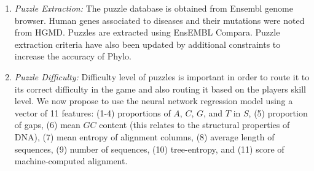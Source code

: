 \documentclass{article}
\begin{document}
\begin{enumerate}
  \item \textit{Puzzle Extraction:} The puzzle database is obtained from Ensembl genome browser\cite{aken2016ensembl}. Human genes associated to diseases and their mutations were noted from HGMD\cite{lualdi2017vitro}. Puzzles are extracted using EnsEMBL Compara. Puzzle extraction criteria have also been updated by additional constraints to increase the accuracy of Phylo.
  \item \textit{Puzzle Difficulty:} Difficulty level of puzzles is important in order to route it to its correct difficulty in the game and also routing it based on the players skill level. 
We now propose to use the neural network regression model using a vector of 11 features:
(1-4) proportions of $A$, $C$, $G$, and $T$ in $S$, (5) proportion of gaps, 
(6) mean $GC$ content (this relates to the structural properties of DNA), (7) mean entropy of alignment columns, 
(8) average length of sequences, 
(9) number of sequences, 
(10) tree-entropy, and
(11) score of machine-computed alignment.


\end{enumerate}
\end{document}
